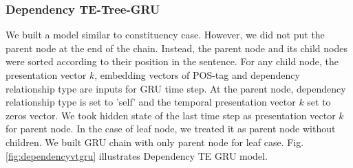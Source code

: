 \subsubsection{Dependency TE-Tree-GRU} \label{sec:VTtreeDependency}
We built a model similar to constituency case.
However, we did not put the parent node at the end of the chain.
Instead, the parent node and its child nodes were sorted according to their position in the sentence.
For any child node, the presentation vector \(k\), embedding vectors of POS-tag and dependency relationship type are inputs for GRU time step.
At the parent node, dependency relationship type is set to 'self' and the temporal presentation vector \(k\) set to zeros vector.
We took hidden state of the last time step as presentation vector \(k\) for parent node.
In the case of leaf node, we treated it as parent node without children.
We built GRU chain with only parent node for leaf case.
Fig.\ref{fig:dependencyvtgru} illustrates Dependency TE GRU model.

